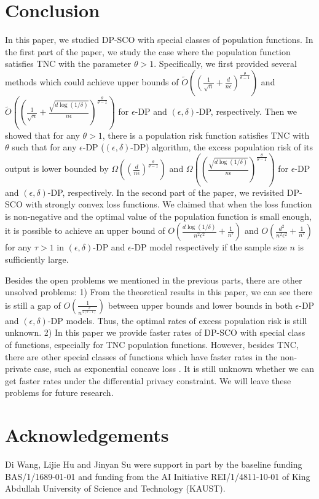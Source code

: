 \documentclass[12pt]{alt2022} %
\renewcommand{\tilde}{\widetilde}
\begin{document}
 \section{Conclusion}
 In this paper, we studied DP-SCO with special classes of population functions. In the first part of the paper, we study the case where the population function satisfies TNC with the parameter $\theta>1$. Specifically, we first provided several methods which could achieve upper bounds of $\tilde{O}((\frac{1}{\sqrt{n}}+\frac{d}{n\epsilon})^\frac{\theta}{\theta-1}) $ and $\tilde{O}((\frac{1}{\sqrt{n}}+\frac{\sqrt{d\log(1/\delta)}}{n\epsilon})^\frac{\theta}{\theta-1})$ for $\epsilon$-DP and $(\epsilon, \delta)$-DP, respectively. Then we showed that for any $\theta>1$, there is a population risk function satisfies TNC with $\theta$ such that for any $\epsilon$-DP ($(\epsilon, \delta)$-DP) algorithm, the excess population risk of its output is lower bounded by $\Omega((\frac{d}{n\epsilon})^\frac{\theta}{\theta-1}) $ and $\Omega((\frac{\sqrt{d\log(1/\delta)}}{n\epsilon})^\frac{\theta}{\theta-1})$ for $\epsilon$-DP and $(\epsilon, \delta)$-DP, respectively. In the second part of the paper, we revisited DP-SCO with strongly convex loss functions. We claimed that when the loss function is non-negative and the optimal value of the population function is small enough, it is possible to achieve an upper bound of $O(\frac{d\log(1/\delta)}{n^2\epsilon^2}+\frac{1}{n^{\tau}})$ and $O(\frac{d^2}{n^2\epsilon^2}+\frac{1}{n^{\tau}})$ for any $\tau> 1$ in $(\epsilon,\delta)$-DP and $\epsilon$-DP model respectively if the sample size $n$ is sufficiently large. 
 
 Besides the open problems we mentioned in the previous parts, there are other unsolved problems: 1) From the theoretical results in this paper, we can see there is still a gap of $O(\frac{1}{n^\frac{\theta}{2(\theta-1)}})$ between upper bounds and lower bounds in both $\epsilon$-DP and $(\epsilon, \delta)$-DP models. Thus, the optimal rates of excess population risk is still unknown. 2) In this paper we provide faster rates of DP-SCO with special class of functions, especially for TNC population functions. However, besides TNC, there are other special classes of functions which have faster rates in the non-private case, such as exponential concave loss \citep{koren2015fast}. It is still unknown whether we can get faster rates under the differential privacy constraint. We will leave these problems for future research. 

\section*{Acknowledgements}
 Di Wang, Lijie Hu and Jinyan Su were support in part by the baseline funding BAS/1/1689-01-01 and funding from the AI Initiative REI/1/4811-10-01 of King Abdullah University of Science and Technology (KAUST).
 
\end{document}
